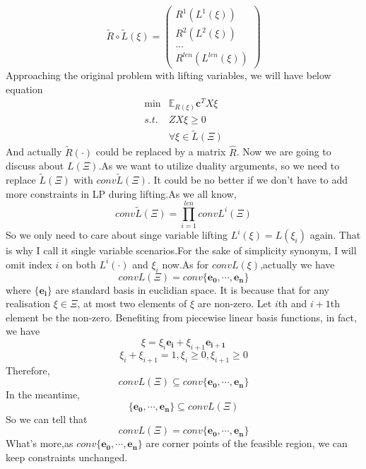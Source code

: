 \documentclass{article}
\begin{document}
$$
\tilde{R}\circ \tilde L (\xi) =
\left(
\begin{array}{c}
R^1(L^1(\xi))\\
R^2(L^2(\xi))\\
\ldots\\
R^{len}(L^{len}(\xi))
\end{array}
\right)
$$
Approaching the original problem with lifting variables, we will have below equation
$$
\begin{array}{ll}
\min & \mathbb{E}_{R(\xi)}  \mathbf{c}^T X\xi\\
s.t. & ZX\xi \geq 0 \\
& \forall \xi \in \tilde{L}(\Xi)
\end{array}
$$
And actually $\tilde{R}(\cdot)$ could be replaced by a matrix $\hat{R}$. Now we are going to discuss about $L(\Xi)$.As we want to utilize duality arguments, so we need to replace $\tilde{L}(\Xi)$ with $conv \tilde{L}(\Xi)$. It could be no better if we don't have to add more constraints in LP during lifting.As we all know,
$$conv\tilde{L}(\Xi) = \prod\limits_{i=1}^{len} conv L^i(\Xi) $$
So we only need to care about singe variable lifting $L^i(\xi) = L(\xi_i)$ again. That is why I call it single variable scenarios.For the sake of simplicity synonym, I will omit index $i$ on both $L^i(\cdot)$ and $\xi_i$ now.As for $conv L(\xi)$,actually we have
$$
conv L(\Xi) = conv\{\mathbf{e_0},\cdots,\mathbf{e_n}\}
$$
where $\{\mathbf{e_i}\}$ are standard basis in euclidian space.
It is because that for any realisation $\xi \in \Xi$, at most two elements of $\xi$ are non-zero. Let $i$th and $i+1$th element be the non-zero. Benefiting from piecewise linear basis functions, in fact, we have
$$\xi = \xi_i \mathbf{e_i} + \xi_{i+1} \mathbf{e_{i+1}}$$
$$\xi_i+\xi_{i+1}=1,\xi_i\geq0,\xi_{i+1}\geq 0$$
Therefore,
$$
conv L(\Xi)  \subseteq conv\{\mathbf{e_0},\cdots,\mathbf{e_n}\}
$$
In the meantime, $$\{\mathbf{e_0},\cdots,\mathbf{e_n}\} \subseteq conv L(\Xi)$$
So we can tell that
$$
conv L(\Xi) = conv\{\mathbf{e_0},\cdots,\mathbf{e_n}\}
$$
What's more,as $conv\{\mathbf{e_0},\cdots,\mathbf{e_n}\}$ are corner points of the feasible region, we can keep constraints unchanged.
\end{document}
